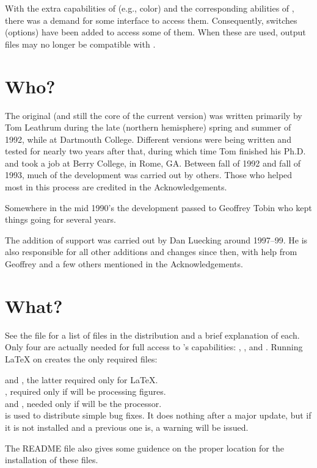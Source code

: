 \documentclass[letterpaper]{article}
\begin{document}
With the extra capabilities of \PS{} (e.g., color) and the corresponding
abilities of \MP{}, there was a demand for some \mfp{} interface to
access them. Consequently, switches (options) have been added to access
some of them. When these are used, output files may no longer be
compatible with \MF{}.

\section{Who?}\label{author}

The original \mfp{} (and still the core of the current version) was written
primarily by Tom Leathrum during the late (northern hemisphere) spring
and summer of 1992, while at Dartmouth College. Different versions were
being written and tested for nearly two years after that, during which
time Tom finished his Ph.D. and took a job at Berry College, in Rome,
GA.  Between fall of 1992 and fall of 1993, much of the development was
carried out by others.  Those who helped most in this process are
credited in the Acknowledgements.

Somewhere in the mid 1990's the development passed to Geoffrey Tobin who
kept things going for several years.

The addition of \MP{} support was carried out by Dan Luecking around
1997--99. He is also responsible for all other additions and changes
since then, with help from Geoffrey and a few others mentioned in the
Acknowledgements.

\section{What?}\label{manifest}

See the  file for a list of files in the distribution and a
brief explanation of each. Only four are actually needed for full access
to \mfp{}'s capabilities: , ,
 and . Running \LaTeX{} on
 creates the only required files:
\begin{display}
     and , the latter required only for
        \LaTeX{}.\\
    , required only if \MF{} will be processing
        figures.\\
     and , needed only if \MP{} will
        be the processor.\\
     is used to distribute simple bug fixes. It does
        nothing after a major update, but if it is not installed and a
        previous one is, a warning will be issued.
\end{display}
The README file also gives some guidence on the proper location for the
installation of these files.
\end{document}
